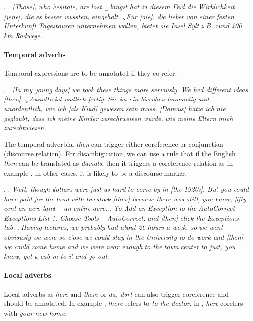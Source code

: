 \documentclass[a4paper]{article}
\begin{document}
\ex.
\a. {\sl [Those], who hesitate, are lost.}
\b. {\sl längst hat in diesem Feld die Wirklichkeit [jene], die es besser wussten, eingeholt.}
\c. {\sl Für [die], die lieber von einer festen Unterkunft Tagestouren unternehmen wollen, bietet die Insel Sylt z.B. rund 200 km Radwege.}


\paragraph*{Temporal adverbs}

Temporal expressions are to be annotated if they co-refer.

\ex.
\a. {\sl [In my young days] we took these things more seriously. We had different ideas [then].}
\c. {\sl Annette ist endlich fertig. Sie ist ein bisschen bummelig und unordentlich, wie ich [als Kind] gewesen sein muss. [Damals] hätte ich nie geglaubt, dass ich meine Kinder zurechtweisen würde, wie meine Eltern mich zurechtwiesen.}

The temporal adverbial {\sl then} can trigger either coreference or conjunction (discourse relation). For disambiguation, we can use a rule that if the English {\sl then} can be translated as {\sl damals}, then it triggers a coreference relation as in example \Next[a]. In  other cases, it is likely to be a discourse marker. 

\ex.
\a. {\sl Well, though dollars were just as hard to come by in [the 1920s]. But you could have paid for the land with livestock [then] because there was still, you know, fifty-cent-an-acre-land -- an entire acre.}
\b. {\sl To Add an Exception to the AutoCorrect Exceptions List 1. Choose Tools -- AutoCorrect, and [then] click the Exceptions tab.}
\c. {\sl 
Having lectures, we probably had about 20 hours a week, so we went obviously we were so close we could stay in the University to do work and [then] we could come home and we were near enough to the town center to just, you know, get a cab in to it and go out.}

\paragraph*{Local adverbs}
Local adverbs as {\sl here} and {\sl there} or {\sl da, dort} can also trigger coreference and should be annotated. In example \Next[a], {\sl there} refers to {\sl to the doctor}, in \Next[b], {\sl here} corefers with {\sl your new home}.
\end{document}
